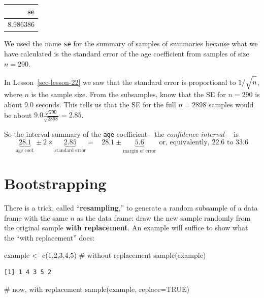 \documentclass[
  letterpaper,
  DIV=11,
  numbers=noendperiod,
  oneside]{scrreprt}
\newenvironment{Shaded}{\begin{snugshade}}{\end{snugshade}}
\newcommand{\AttributeTok}[1]{\textcolor[rgb]{0.40,0.45,0.13}{#1}}
\newcommand{\CommentTok}[1]{\textcolor[rgb]{0.37,0.37,0.37}{#1}}
\newcommand{\ConstantTok}[1]{\textcolor[rgb]{0.56,0.35,0.01}{#1}}
\newcommand{\DecValTok}[1]{\textcolor[rgb]{0.68,0.00,0.00}{#1}}
\newcommand{\FunctionTok}[1]{\textcolor[rgb]{0.28,0.35,0.67}{#1}}
\newcommand{\NormalTok}[1]{\textcolor[rgb]{0.00,0.23,0.31}{#1}}
\newcommand{\OtherTok}[1]{\textcolor[rgb]{0.00,0.23,0.31}{#1}}
\begin{document}
\ttfamily 
\begin{tabular}{r}
\toprule
se\\
\midrule
8.986386\\
\bottomrule
\end{tabular} \normalfont
\bigskip

We used the name \texttt{se} for the summary of samples of summaries
because what we have calculated is the standard error of the age
coefficient from samples of size \(n=290\).

In Lesson~\ref{sec-lesson-22} we saw that the standard error is
proportional to \(1/\sqrt{\strut n}\), where \(n\) is the sample size.
From the subsamples, know that the SE for \(n=290\) is about 9.0
seconds. This tells us that the SE for the full \(n=2898\) samples would
be about \(9.0 \frac{\sqrt{290}}{\sqrt{2898}} = 2.85\).

So the interval summary of the \texttt{age} coefficient---the
\emph{confidence interval}--- is
\[\underbrace{28.1}_\text{age coef.} \pm 2\times\!\!\!\!\!\!\! \underbrace{2.85}_\text{standard error} =\ \ \ \  28.1 \pm\!\!\!\!\!\!\!\! \underbrace{5.6}_\text{margin of error}\ \  \text{or, equivalently, 22.6 to 33.6}\]

\hypertarget{bootstrapping}{%
\section{Bootstrapping}\label{bootstrapping}}

There is a trick, called ``\textbf{resampling},'' to generate a random
subsample of a data frame with the same \(n\) as the data frame: draw
the new sample randomly from the original sample \textbf{with
replacement}. An example will suffice to show what the ``with
replacement'' does:

\begin{Shaded}
\begin{Highlighting}[]
\NormalTok{example }\OtherTok{\textless{}{-}} \FunctionTok{c}\NormalTok{(}\DecValTok{1}\NormalTok{,}\DecValTok{2}\NormalTok{,}\DecValTok{3}\NormalTok{,}\DecValTok{4}\NormalTok{,}\DecValTok{5}\NormalTok{)}
\CommentTok{\# without replacement}
\FunctionTok{sample}\NormalTok{(example)}
\end{Highlighting}
\end{Shaded}

\begin{verbatim}
[1] 1 4 3 5 2
\end{verbatim}

\begin{Shaded}
\begin{Highlighting}[]
\CommentTok{\# now, with replacement}
\FunctionTok{sample}\NormalTok{(example, }\AttributeTok{replace=}\ConstantTok{TRUE}\NormalTok{)}
\end{Highlighting}
\end{Shaded}
\end{document}

